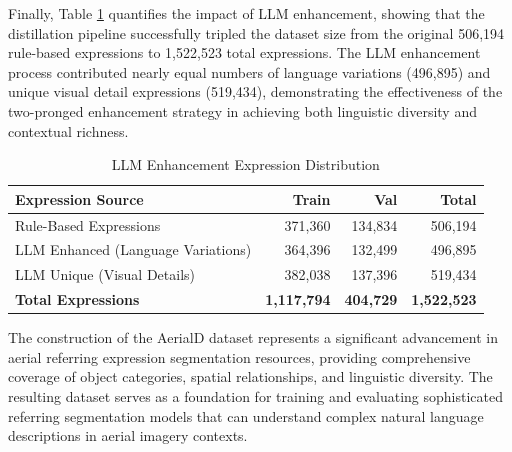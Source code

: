 Finally, Table \ref{tab:llm_enhancement_stats} quantifies the impact of LLM enhancement, showing that the distillation pipeline successfully tripled the dataset size from the original 506,194 rule-based expressions to 1,522,523 total expressions. The LLM enhancement process contributed nearly equal numbers of language variations (496,895) and unique visual detail expressions (519,434), demonstrating the effectiveness of the two-pronged enhancement strategy in achieving both linguistic diversity and contextual richness.

\begin{table}[H]
\centering
\caption{LLM Enhancement Expression Distribution}
\label{tab:llm_enhancement_stats}
\begin{tabular}{@{}lrrr@{}}
\toprule
\textbf{Expression Source} & \textbf{Train} & \textbf{Val} & \textbf{Total} \\
\midrule
Rule-Based Expressions & 371,360 & 134,834 & 506,194 \\
LLM Enhanced (Language Variations) & 364,396 & 132,499 & 496,895 \\
LLM Unique (Visual Details) & 382,038 & 137,396 & 519,434 \\
\midrule
\textbf{Total Expressions} & \textbf{1,117,794} & \textbf{404,729} & \textbf{1,522,523} \\
\bottomrule
\end{tabular}
\end{table}

The construction of the AerialD dataset represents a significant advancement in aerial referring expression segmentation resources, providing comprehensive coverage of object categories, spatial relationships, and linguistic diversity. The resulting dataset serves as a foundation for training and evaluating sophisticated referring segmentation models that can understand complex natural language descriptions in aerial imagery contexts.



